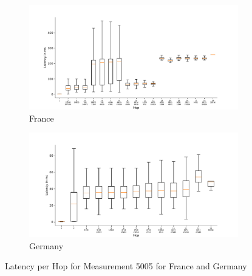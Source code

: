 \begin{figure}
	\centering
	\begin{subfigure}[b]{\linewidth}
		\includegraphics[width=\linewidth]{chapters/4-results/traceroute/img/latency-per-hop-FR-5005.pdf}
		\caption{France}
	\end{subfigure}
	\begin{subfigure}[b]{\linewidth}
		\includegraphics[width=\linewidth]{chapters/4-results/traceroute/img/latency-per-hop-DE-5005.pdf}
		\caption{Germany}
	\end{subfigure}
	\caption{Latency per Hop for Measurement 5005 for France and Germany}
	\label{fig:latency-change-per-hop-appendix-4}
\end{figure}


